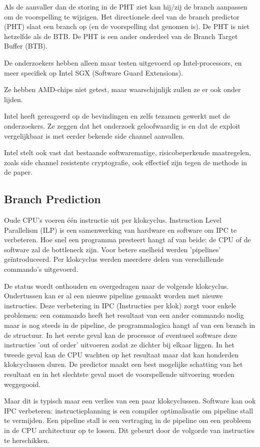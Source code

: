 Als de aanvaller dan de storing in de PHT ziet kan hij/zij de branch aanpassen om de voorspelling te wijzigen.
Het directionele deel van de branch predictor (PHT) slaat een branch op (en de voorspelling dat genomen is).
De PHT is niet hetzelfde als de BTB.
De PHT is een ander onderdeel van de Branch Target Buffer (BTB).


De onderzoekers hebben alleen maar testen uitgevoerd op Intel-processors, en meer specifiek op Intel SGX (Software Guard Extensions).

Ze hebben AMD-chips niet getest, maar waarschijnlijk zullen ze er ook onder lijden.

Intel heeft gereageerd op de bevindingen en zelfs tezamen gewerkt met de onderzoekers.
Ze zeggen dat het onderzoek geloofwaardig is en dat de exploit vergelijkbaar is met eerder bekende side channel aanvallen.

Intel stelt ook vast dat bestaande softwarematige, risicobeperkende maatregelen, zoals side channel resistente cryptografie, ook effectief zijn tegen de methode in de paper.

\subsection{Branch Prediction}
Oude CPU's voeren één instructie uit per klokcyclus.
Instruction Level Parallelism (ILP) is een samenwerking van hardware en software om IPC te verbeteren. Hoe snel een programma presteert hangt af van beide: de CPU of de software zal de bottleneck zijn.
Voor betere snelheid werden 'pipelines' geïntroduceerd. Per klokcyclus werden meerdere delen van verschillende commando's uitgevoerd. 

De status wordt onthouden en overgedragen naar de volgende klokcyclus. Ondertussen kan er al een nieuwe pipeline gemaakt worden met nieuwe instructies. Deze verbetering in IPC (Instructies per klok) zorgt voor enkele problemen: een commando heeft het resultaat van een ander commando nodig maar is nog steeds in de pipeline, de programmalogica hangt af van een branch in de structuur. In het eerste geval kan de processor of eventueel software deze instructies 'out of order' uitvoeren zodat ze dichter bij elkaar liggen. In het tweede geval kan de CPU wachten op het resultaat maar dat kan honderden klokcyclussen duren. De predictor maakt een best mogelijke schatting van het resultaat en in het slechtste geval moet de voorspellende uitvoering  worden weggegooid.

Maar dit is typisch maar een verlies van een paar klokcyclussen.
Software kan ook IPC verbeteren: instructieplanning is een compiler optimalisatie om pipeline stall te vermijden.
Een pipeline stall is een vertraging in de pipeline om een probleem in de CPU architectuur op te lossen.
Dit gebeurt door de volgorde van instructies te herschikken.

